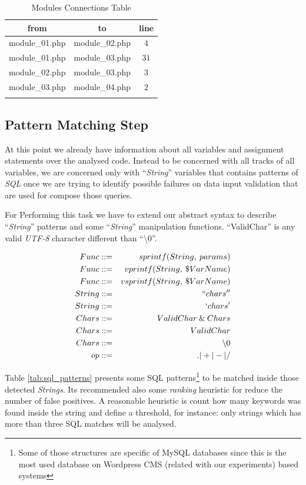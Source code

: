 \begin{table}[ht] 
\caption{Modules Connections Table}
\centering
\begin{tabular}{c c c}
\hline\hline
from & to & line \\ [0.5ex]
\hline
module\_01.php & module\_02.php & $4$ \\
module\_01.php & module\_03.php & $31$ \\
module\_02.php & module\_03.php & $3$ \\
module\_03.php & module\_04.php & $2$ \\
\hline
\label{tab:kb_require}
\end{tabular}
\end{table}

\subsection{Pattern Matching Step}
At this point we already have information about all variables and assignment statements over the analysed code. Instead to be concerned with all tracks of all variables, we are concerned only with ``\textit{String}'' variables that contains patterns of \textit{SQL} once we are trying to identify possible failures on data input validation that are used for compose those queries. 

For Performing this task we have to extend our abstract syntax to describe ``\textit{String}'' patterns and some ``\textit{String}'' manipulation functions. ``ValidChar'' is any valid \textit{UTF-8} character different than ``\textbackslash0''.

\begin{eqnarray*}
Func & ::= & sprintf(String,\:params) \\
Func & ::= & vprintf(String,\:\$VarName) \\
Func & ::= & vsprintf(String,\:\$VarName) \\
String & ::= & ``chars'' \\
String & ::= & `chars' \\
Chars & ::= & ValidChar\:\&\:Chars \\
Chars & ::= & ValidChar \\
Chars & ::= & \symbol{92}0 \\
op & ::= & .|+|-|/ \\
\end{eqnarray*}

Table \ref{tab:sql_patterns} presents some SQL patterns\footnote{Some of those structures are specific of MySQL databases since this is the most used database on Wordpress CMS (related with our experiments) based systems} to be matched inside those detected \textit{Strings}. Its recommended also some \textit{ranking} heuristic for reduce the number of false positives. A reasonable heuristic is count how many keywords was found inside the string and define a threshold, for instance: only strings which has more than three SQL matches will be analysed.   

